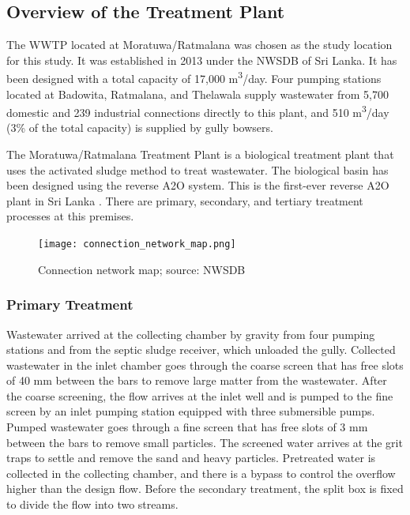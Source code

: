 \subsection{Overview of the Treatment Plant}

The \ac{WWTP} located at Moratuwa/Ratmalana was chosen as the study location for this study. It was established in 2013 under the \ac{NWSDB} of Sri Lanka. It has been designed with a total capacity of 17,000 \unit{m^3}/day. Four pumping stations located at Badowita, Ratmalana, and Thelawala supply wastewater from 5,700 domestic and 239 industrial connections directly to this plant, and 510 \unit{m^3}/day (3\% of the total capacity) is supplied by gully bowsers.

The Moratuwa/Ratmalana Treatment Plant is a biological treatment plant that uses the activated sludge method to treat wastewater. The biological basin has been designed using the reverse A2O system. This is the first-ever reverse A2O plant in Sri Lanka \cite{Danushika2016}. There are primary, secondary, and tertiary treatment processes at this premises. 

\begin{figure}[H]
\centering
\texttt{[image: connection\_network\_map.png]}
\caption{Connection network map; source: \ac{NWSDB}}
\label{fig:connection_network_map}
\end{figure}



\subsubsection{Primary Treatment}
Wastewater arrived at the collecting chamber by gravity from four pumping stations and from the septic sludge receiver, which unloaded the gully. Collected wastewater in the inlet chamber goes through the coarse screen that has free slots of 40 mm between the bars to remove large matter from the wastewater. After the coarse screening, the flow arrives at the inlet well and is pumped to the fine screen by an inlet pumping station equipped with three submersible pumps. Pumped wastewater goes through a fine screen that has free slots of 3 mm between the bars to remove small particles. The screened water arrives at the grit traps to settle and remove the sand and heavy particles. Pretreated water is collected in the collecting chamber, and there is a bypass to control the overflow higher than the design flow. Before the secondary treatment, the split box is fixed to divide the flow into two streams.

